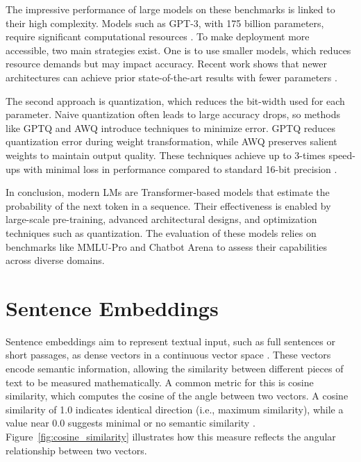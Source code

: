 \documentclass[a4paper,oneside,bibliography=totoc]{scrbook}
\begin{document}
The impressive performance of large models on these benchmarks is linked to their high complexity. Models such as GPT-3, with 175 billion parameters, require significant computational resources \cite{Brown2020,Frantar2023}. To make deployment more accessible, two main strategies exist. One is to use smaller models, which reduces resource demands but may impact accuracy. Recent work shows that newer architectures can achieve prior state-of-the-art results with fewer parameters \cite{Grattafiori2024,Meta2024}.

The second approach is quantization, which reduces the bit-width used for each parameter. Naive quantization often leads to large accuracy drops, so methods like GPTQ and AWQ introduce techniques to minimize error. GPTQ reduces quantization error during weight transformation, while AWQ preserves salient weights to maintain output quality. These techniques achieve up to 3-times speed-ups with minimal loss in performance compared to standard 16-bit precision \cite{Frantar2023,Lin2024}.

In conclusion, modern \acp{LM} are Transformer-based models that estimate the probability of the next token in a sequence. Their effectiveness is enabled by large-scale pre-training, advanced architectural designs, and optimization techniques such as quantization. The evaluation of these models relies on benchmarks like MMLU-Pro and Chatbot Arena to assess their capabilities across diverse domains.

\section{Sentence Embeddings}
\label{sec:sentence_embeddings}

Sentence embeddings aim to represent textual input, such as full sentences or short passages, as dense vectors in a continuous vector space \cite{Singhal2001}. These vectors encode semantic information, allowing the similarity between different pieces of text to be measured mathematically. A common metric for this is cosine similarity, which computes the cosine of the angle between two vectors. A cosine similarity of 1.0 indicates identical direction (i.e., maximum similarity), while a value near 0.0 suggests minimal or no semantic similarity \cite{Singhal2001}. Figure~\ref{fig:cosine_similarity} illustrates how this measure reflects the angular relationship between two vectors.
\end{document}
